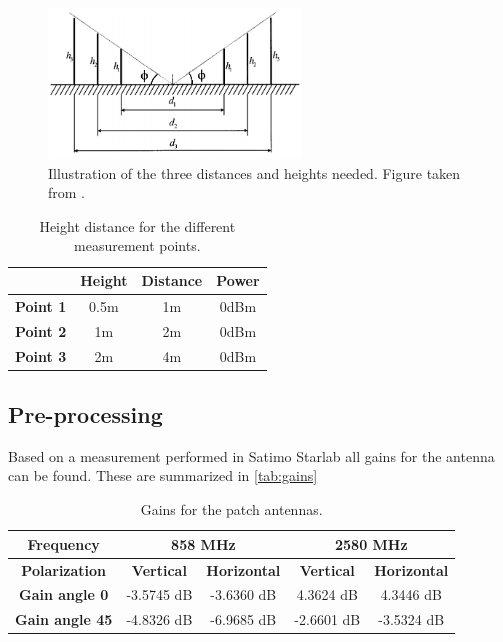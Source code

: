 \begin{figure}[H]
\centering
\includegraphics[width=0.6\textwidth]{figure/measurepoints.png}
\caption{Illustration of the three distances and heights needed. Figure taken from \citep{Kim}.}
\label{fig:measurepoints}
\end{figure}


\begin{table}[H]
\centering
\begin{tabular}{|c|c|c|c|}\hline
					&\textbf{Height}	&\textbf{Distance}	&\textbf{Power}	\\\hline
\textbf{Point 1}	&0.5m				&1m					&0dBm			\\\hline
\textbf{Point 2}	&1m					&2m					&0dBm			\\\hline
\textbf{Point 3}	&2m					&4m					&0dBm			\\\hline
\end{tabular}
\caption{Height distance for the different measurement points.}
\label{tab:height_distance}
\end{table}


\subsection{Pre-processing}
Based on a measurement performed in Satimo Starlab all gains for the antenna can be found. These are summarized in \autoref{tab:gains}
\begin{table}[H]
\centering
\begin{tabular}{|c|c|c|c|c|}\hline
\textbf{Frequency}		& \multicolumn{2}{c|}{\textbf{858 MHz}}&\multicolumn{2}{c|}{\textbf{2580 MHz}}		\\\hline
\textbf{Polarization}	& \textbf{Vertical}	&\textbf{Horizontal}	& \textbf{Vertical}	&\textbf{Horizontal}\\\hline		
\textbf{Gain angle 0}	&-3.5745 dB	&-3.6360 dB	&4.3624 dB	&4.3446 dB	\\\hline
\textbf{Gain angle 45}	&-4.8326 dB	&-6.9685 dB	&-2.6601 dB	&-3.5324 dB	\\\hline		
\end{tabular}
\caption{Gains for the patch antennas.}
\label{tab:gains}
\end{table} 

